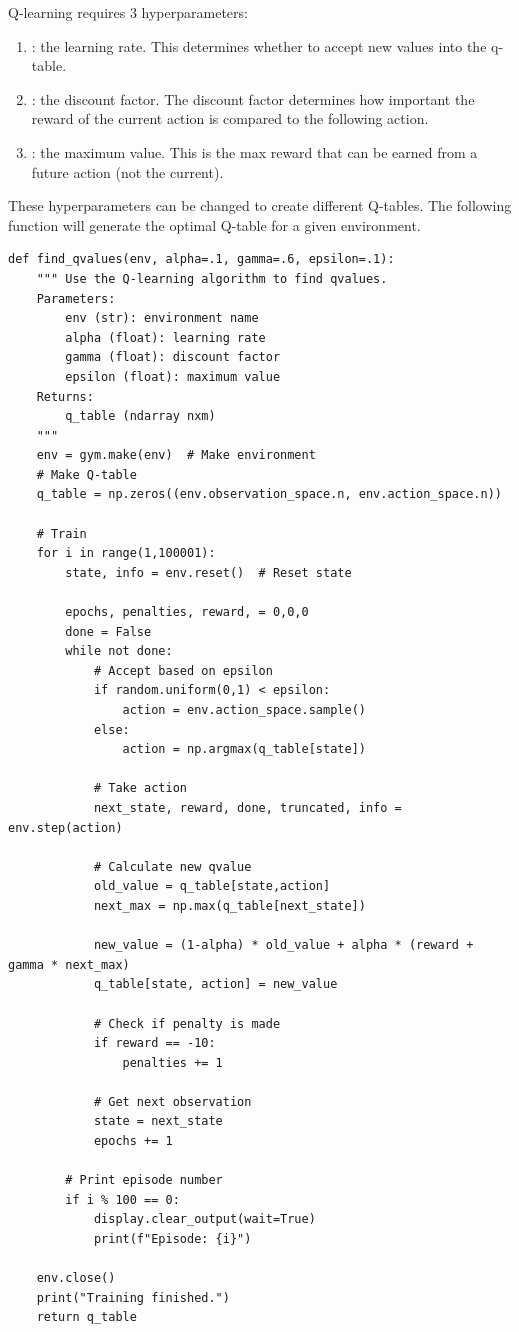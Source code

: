 Q-learning requires 3 hyperparameters:
\begin{enumerate}
\item {}: the learning rate. This determines whether to accept new values into the q-table.
\item {}: the discount factor. The discount factor determines how important the reward of the current action is compared to the following action.
\item {}: the maximum value. This is the max reward that can be earned from a future action (not the current).
\end{enumerate}
These hyperparameters can be changed to create different Q-tables. 
The following function will generate the optimal Q-table for a given environment.

\begin{lstlisting}
def find_qvalues(env, alpha=.1, gamma=.6, epsilon=.1):
    """ Use the Q-learning algorithm to find qvalues.
    Parameters:
        env (str): environment name
        alpha (float): learning rate
        gamma (float): discount factor
        epsilon (float): maximum value
    Returns:
        q_table (ndarray nxm)
    """
    env = gym.make(env)  # Make environment
    # Make Q-table
    q_table = np.zeros((env.observation_space.n, env.action_space.n))

    # Train
    for i in range(1,100001):
        state, info = env.reset()  # Reset state

        epochs, penalties, reward, = 0,0,0
        done = False
        while not done:
            # Accept based on epsilon
            if random.uniform(0,1) < epsilon:
                action = env.action_space.sample()
            else:
                action = np.argmax(q_table[state])

            # Take action
            next_state, reward, done, truncated, info = env.step(action)

            # Calculate new qvalue
            old_value = q_table[state,action]
            next_max = np.max(q_table[next_state])

            new_value = (1-alpha) * old_value + alpha * (reward + gamma * next_max)
            q_table[state, action] = new_value

            # Check if penalty is made
            if reward == -10:
                penalties += 1

            # Get next observation
            state = next_state
            epochs += 1

        # Print episode number
        if i % 100 == 0:
            display.clear_output(wait=True)
            print(f"Episode: {i}")

    env.close()
    print("Training finished.")
    return q_table
\end{lstlisting}

